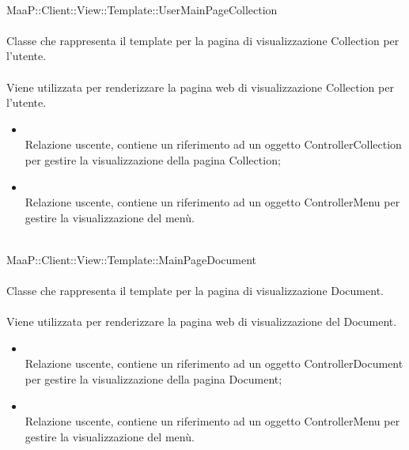 	\\
	MaaP::Client::View::Template::UserMainPageCollection\\
	\\
	Classe che rappresenta il template per la pagina di visualizzazione Collection per l'utente.\\
	\\
	Viene utilizzata per renderizzare la pagina web di visualizzazione Collection per l'utente.\\
	\begin{itemize}
	\item{}\\
	Relazione uscente, contiene un riferimento ad un oggetto ControllerCollection per gestire la visualizzazione della pagina Collection;
	\item{}\\
	Relazione uscente, contiene un riferimento ad un oggetto ControllerMenu per gestire la visualizzazione del menù.
	\end{itemize}
	
	\\
	MaaP::Client::View::Template::MainPageDocument\\
	\\
	Classe che rappresenta il template per la pagina di visualizzazione Document.\\
	\\
	Viene utilizzata per renderizzare la pagina web di visualizzazione del Document.\\
	\begin{itemize}
	\item{}\\
	Relazione uscente, contiene un riferimento ad un oggetto ControllerDocument per gestire la visualizzazione della pagina Document;
	\item{}\\
	Relazione uscente, contiene un riferimento ad un oggetto ControllerMenu per gestire la visualizzazione del menù.
	\end{itemize}
	
